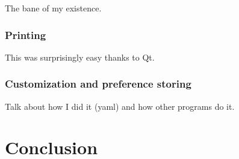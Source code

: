 \documentclass[11pt]{article}
\begin{document}
The bane of my existence.

\subsubsection{Printing}

This was surprisingly easy thanks to Qt.

\subsubsection{Customization and preference storing}

Talk about how I did it (yaml) and how other programs do it.

\section{Conclusion}

\newpage
\nocite{*}


\end{document}
